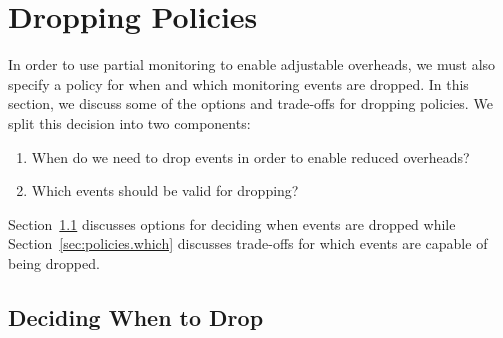 \section{Dropping Policies}
\label{sec:policies}

In order to use partial monitoring to enable adjustable overheads, we must also
specify a policy for when and which monitoring events are dropped. In this
section, we discuss some of the options and trade-offs for dropping policies.
We split this decision into two components:
\begin{enumerate}
  \item When do we need to drop events in order to enable reduced overheads?
  \item Which events should be valid for dropping?
\end{enumerate}

Section~\ref{sec:policies.when} discusses options for deciding when events are
dropped while Section~\ref{sec:policies.which} discusses trade-offs for which
events are capable of being dropped. 


\subsection{Deciding When to Drop}
\label{sec:policies.when}

